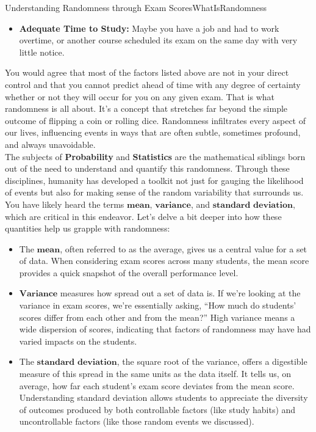 \begin{funColor}{Understanding Randomness through Exam Scores}{WhatIsRandomness}
\begin{itemize}
   \item \textbf{Adequate Time to Study:} Maybe you have a job and had to work overtime, or another course scheduled its exam on the same day with very little notice. 
\end{itemize}


You would agree that most of the factors listed above are not in your direct control and that you cannot predict ahead of time with any degree of certainty whether or not they will occur for you on any given exam. That is what randomness is all about. It's a concept that stretches far beyond the simple outcome of flipping a coin or rolling dice. Randomness infiltrates every aspect of our lives, influencing events in ways that are often subtle, sometimes profound, and always unavoidable.\\

The subjects of \textbf{Probability} and \textbf{Statistics} are the mathematical siblings born out of the need to understand and quantify this randomness. Through these disciplines, humanity has developed a toolkit not just for gauging the likelihood of events but also for making sense of the random variability that surrounds us. You have likely heard the terms $\textbf{mean}$, $\textbf{variance}$, and $\textbf{standard deviation}$, which are critical in this endeavor. Let's delve a bit deeper into how these quantities help us grapple with randomness:

\begin{itemize}
    \item The $\textbf{mean}$, often referred to as the average, gives us a central value for a set of data. When considering exam scores across many students, the mean score provides a quick snapshot of the overall performance level.
    \item $\textbf{Variance}$ measures how spread out a set of data is. If we're looking at the variance in exam scores, we're essentially asking, ``How much do students' scores differ from each other and from the mean?'' High variance means a wide dispersion of scores, indicating that factors of randomness may have had varied impacts on the students.
    \item The $\textbf{standard deviation}$, the square root of the variance, offers a digestible measure of this spread in the same units as the data itself. It tells us, on average, how far each student's exam score deviates from the mean score. Understanding standard deviation allows students to appreciate the diversity of outcomes produced by both controllable factors (like study habits) and uncontrollable factors (like those random events we discussed).
\end{itemize}


\end{funColor}
